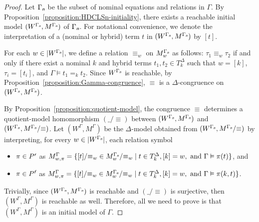 \documentclass[a4paper,UKenglish,cleveref,autoref]{lipics-v2019}
\begin{document}
\begin{proof}
  Let \(\Gamma_{\text{\normalfont\sffamily\itshape n}}\) be the subset of nominal equations and relations in \(\Gamma\).
  By Proposition~\ref{proposition:HDCLSn-initiality}, there exists a reachable initial model \((W^{\Gamma_{\text{\normalfont\sffamily\itshape n}}}, M^{\Gamma_{\text{\normalfont\sffamily\itshape n}}})\) of \(\Gamma_{\text{\normalfont\sffamily\itshape n}}\).
  For notational convenience, we denote the interpretation of a (nominal or hybrid) term \(t\) in \((W^{\Gamma_{\text{\normalfont\sffamily\itshape n}}}, M^{\Gamma_{\text{\normalfont\sffamily\itshape n}}})\) by \([t]\).

  For each \(w \in |W^{\Gamma_{\text{\normalfont\sffamily\itshape n}}}|\), we define a relation \(\equiv_{w}\) on \(M^{\Gamma_{\text{\normalfont\sffamily\itshape n}}}_{w}\) as follows:
  \(\tau_{1} \equiv_{w} \tau_{2}\) if and only if there exist a nominal \(k\) and hybrid terms \(t_{1}, t_{2} \in T^{\Delta}_{k}\) such that \(w = [k]\), \(\tau_{i} = [t_{i}]\), and \(\Gamma \models t_{1} =_{k} t_{2}\).
  Since \(W^{\Gamma_{\text{\normalfont\sffamily\itshape n}}}\) is reachable, by Proposition~\ref{proposition:Gamma-congruence}, \(\equiv\) is a \(\Delta\)-congruence on \((W^{\Gamma_{\text{\normalfont\sffamily\itshape n}}}, M^{\Gamma_{\text{\normalfont\sffamily\itshape n}}})\).

  By Proposition~\ref{proposition:quotient-model}, the congruence \(\equiv\) determines a quotient-model homomorphism \((\_ /{\equiv})\) between  \((W^{\Gamma_{\text{\normalfont\sffamily\itshape n}}}, M^{\Gamma_{\text{\normalfont\sffamily\itshape n}}})\) and \((W^{\Gamma_{\text{\normalfont\sffamily\itshape n}}}, M^{\Gamma_{\text{\normalfont\sffamily\itshape n}}}/{\equiv})\).
  Let \((W^{\Gamma}, M^{\Gamma})\) be the \(\Delta\)-model obtained from \((W^{\Gamma_{\text{\normalfont\sffamily\itshape n}}}, M^{\Gamma_{\text{\normalfont\sffamily\itshape n}}}/{\equiv})\) by interpreting, for every \(w \in |W^{\Gamma_{\text{\normalfont\sffamily\itshape n}}}|\), each relation symbol
  \begin{itemize}
  \item \(\pi \in P^{\text{\normalfont\sffamily\itshape r}}\) as \(M^{\Gamma}_{w, \pi} = \{[t]/{\equiv_{w}} \in M^{\Gamma_{\text{\normalfont\sffamily\itshape n}}}_{w}/{\equiv_{w}} \mid t \in T^{\Delta}_{k}, [k] = w,\ \text{and}\ \Gamma \vDash \pi(t)\}\), and
  \item \(\pi \in P^{\text{\normalfont\sffamily\itshape f}}\) as \(M^{\Gamma}_{w, \pi} = \{[t]/{\equiv_{w}} \in M^{\Gamma_{\text{\normalfont\sffamily\itshape n}}}_{w}/{\equiv_{w}} \mid t \in T^{\Delta}_{k}, [k] = w,\ \text{and}\ \Gamma \vDash \pi(k, t)\}\).
  \end{itemize}
  Trivially, since \((W^{\Gamma_{\text{\normalfont\sffamily\itshape n}}}, M^{\Gamma_{\text{\normalfont\sffamily\itshape n}}})\) is reachable and \((\_ /{\equiv})\) is surjective, then \((W^{\Gamma}, M^{\Gamma})\) is reachable as well.
  Therefore, all we need to prove is that \((W^{\Gamma}, M^{\Gamma})\) is an initial model of \(\Gamma\).


\end{proof}
\end{document}
